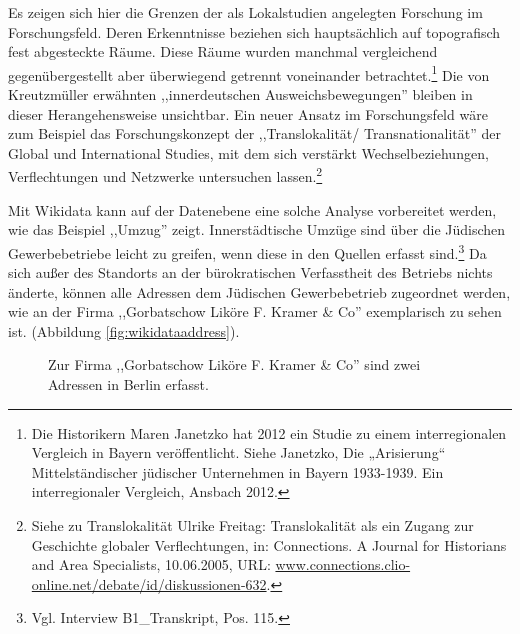 Es zeigen sich hier die Grenzen der als Lokalstudien angelegten Forschung im Forschungsfeld. Deren Erkenntnisse beziehen sich hauptsächlich auf topografisch fest abgesteckte Räume. Diese Räume wurden manchmal vergleichend gegenübergestellt aber überwiegend getrennt voneinander betrachtet.\footnote{Die Historikern Maren Janetzko hat 2012 ein Studie zu einem interregionalen Vergleich in Bayern veröffentlicht. Siehe Janetzko, Die „Arisierung“ Mittelständischer jüdischer Unternehmen in Bayern 1933-1939. Ein interregionaler Vergleich, Ansbach 2012.} Die von Kreutzmüller erwähnten ,,innerdeutschen Ausweichsbewegungen'' bleiben in dieser Herangehensweise unsichtbar. Ein neuer Ansatz im Forschungsfeld wäre zum Beispiel das Forschungskonzept der ,,Translokalität/ Transnationalität'' der Global und International Studies, mit dem sich verstärkt Wechselbeziehungen, Verflechtungen und Netzwerke untersuchen lassen.\footnote{Siehe zu Translokalität Ulrike Freitag: Translokalität als ein Zugang zur Geschichte globaler Verflechtungen, in: Connections. A Journal for Historians and Area Specialists, 10.06.2005, URL: \url{www.connections.clio-online.net/debate/id/diskussionen-632}.} 

Mit Wikidata kann auf der Datenebene eine solche Analyse vorbereitet werden, wie das Beispiel ,,Umzug'' zeigt. Innerstädtische Umzüge sind über die Jüdischen Gewerbebetriebe leicht zu greifen, wenn diese in den Quellen erfasst sind.\footnote{Vgl. Interview B1\_Transkript, Pos. 115.} Da sich außer des Standorts an der bürokratischen Verfasstheit des Betriebs nichts änderte, können alle Adressen dem Jüdischen Gewerbebetrieb zugeordnet werden, wie an der Firma ,,Gorbatschow Liköre F. Kramer \& Co'' exemplarisch zu sehen ist. (Abbildung \ref{fig:wikidataaddress}).

\begin{figure}[h]
    \centering
    \caption[Innerstädtische Umzüge]{Zur Firma ,,Gorbatschow Liköre F. Kramer \& Co'' sind zwei Adressen in Berlin erfasst.}
    \label{fig:wiwikidataaddress}
\end{figure}

